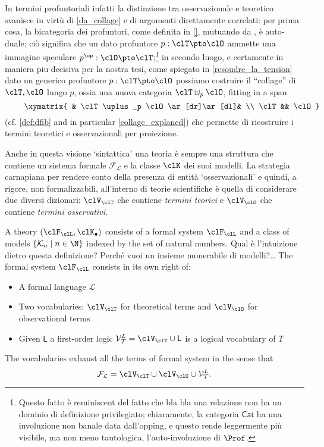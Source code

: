 In termini profuntoriali infatti la distinzione tra osservazionale e teoretico svanisce in virtù di \autoref{da_collage} e di argomenti direttamente correlati: per prima cosa, la bicategoria dei profuntori, come definita in \autoref{}, mutuando da \cite{benabou2000distributors}, è auto-duale; ciò significa che un dato profuntore $p : \clT \pto \clO$ ammette una immagine speculare $p^\op : \clO \pto \clT$;\footnote{Questo fatto è reminiscent del fatto che bla bla una relazione non ha un dominio di definizione privilegiato; chiaramente, la categoria $\mathsf{Cat}$ ha una involuzione non banale data dall'opping, e questo rende leggermente più visibile, ma non meno tautologica, l'auto-involuzione di $\Prof$.} in secondo luogo, e certamente in maniera piu decisiva per la nostra tesi, come spiegato in \autoref{resoudre_la_tension} dato un generico profuntore $p : \clT \pto\clO$ possiamo costruire il ``collage'' di $\clT,\clO$ lungo $p$, ossia una nuova categoria $\clT\uplus_p\clO$, fitting in a span 
\[ \vcenter{\xymatrix{
	& \clT\uplus_p \clO \ar[dr]\ar[dl]& \\ 
	\clT  && \clO 
}} \] (cf. \autoref{def:dfib} and in particular \autoref{collage_explaned}) che permette di ricostruire i termini teoretici e osservazionali per proiezione.
\begin{remark}\label{hint_at_collage}
	Anche in questa visione `sintattica' \cite{giunti2016} una teoria è sempre una struttura che contiene un sistema formale $\mathcal{F_L}$ e la classe $\clK$ dei suoi modelli. La strategia carnapiana per rendere conto della presenza di entità `osservazionali' e quindi, a rigore, non formalizzabili, all'interno di teorie scientifiche è quella di considerare due diversi dizionari: $\clV_\clT$ che contiene \emph{termini teorici} e $\clV_\clO$ che contiene \emph{termini osservativi}. 
\end{remark}


\begin{definition}
	A theory $(\clF_\clL, \clK_\bullet)$ consists of a formal system $\clF_\clL$ and a class of models $\{\mathcal{K}_n \mid n \in \N \}$ indexed by the set of natural numbers. 
	{\color{red} Qual è l'intuizione dietro questa definizione? Perché vuoi un insieme numerabile di modelli?\dots}
	The formal system $\clF_\clL$ consists in its own right of:
	\begin{itemize}
		\item A formal language $\mathcal{L}$ 
		\item Two vocabularies: $\clV_\clT$ for theoretical terms and $\clV_\clO$ for observational terms 
		\item Given $\mathsf{L}$ a first-order logic $\mathcal{V}_{\mathcal{T}}^L = \clV_\clT \cup \mathsf{L}$ is a logical vocabulary of $T$
	\end{itemize}    
\end{definition}
The vocabularies exhaust all the terms of formal system in the sense that 
\[\mathcal{F_L} = \clV_\clT \cup \clV_\clO \cup \mathcal{V}_{\mathcal{T}}^L.\]

